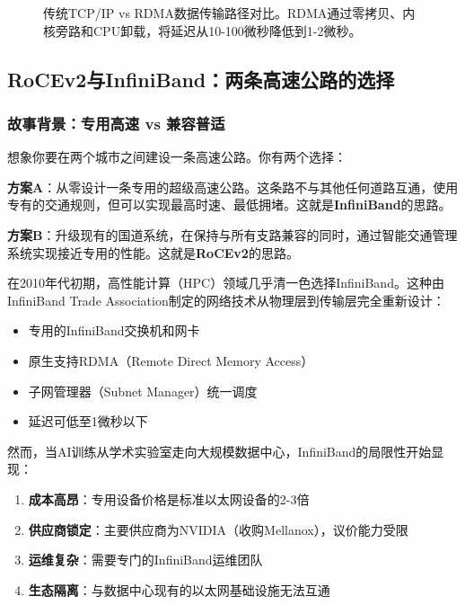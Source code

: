 \begin{figure}[htbp]
\centering

\caption{传统TCP/IP vs RDMA数据传输路径对比。RDMA通过零拷贝、内核旁路和CPU卸载，将延迟从10-100微秒降低到1-2微秒。}
\label{fig:rdma_data_path}
\end{figure}

\subsection{RoCEv2与InfiniBand：两条高速公路的选择}

\subsubsection{故事背景：专用高速 vs 兼容普适}

想象你要在两个城市之间建设一条高速公路。你有两个选择：

\textbf{方案A}：从零设计一条专用的超级高速公路。这条路不与其他任何道路互通，使用专有的交通规则，但可以实现最高时速、最低拥堵。这就是\textbf{InfiniBand}的思路。

\textbf{方案B}：升级现有的国道系统，在保持与所有支路兼容的同时，通过智能交通管理系统实现接近专用的性能。这就是\textbf{RoCEv2}的思路。

在2010年代初期，高性能计算（HPC）领域几乎清一色选择InfiniBand。这种由InfiniBand Trade Association制定的网络技术从物理层到传输层完全重新设计：

\begin{itemize}
    \item 专用的InfiniBand交换机和网卡
    \item 原生支持RDMA（Remote Direct Memory Access）
    \item 子网管理器（Subnet Manager）统一调度
    \item 延迟可低至1微秒以下
\end{itemize}

然而，当AI训练从学术实验室走向大规模数据中心，InfiniBand的局限性开始显现：

\begin{enumerate}
    \item \textbf{成本高昂}：专用设备价格是标准以太网设备的2-3倍
    \item \textbf{供应商锁定}：主要供应商为NVIDIA（收购Mellanox），议价能力受限
    \item \textbf{运维复杂}：需要专门的InfiniBand运维团队
    \item \textbf{生态隔离}：与数据中心现有的以太网基础设施无法互通
\end{enumerate}


